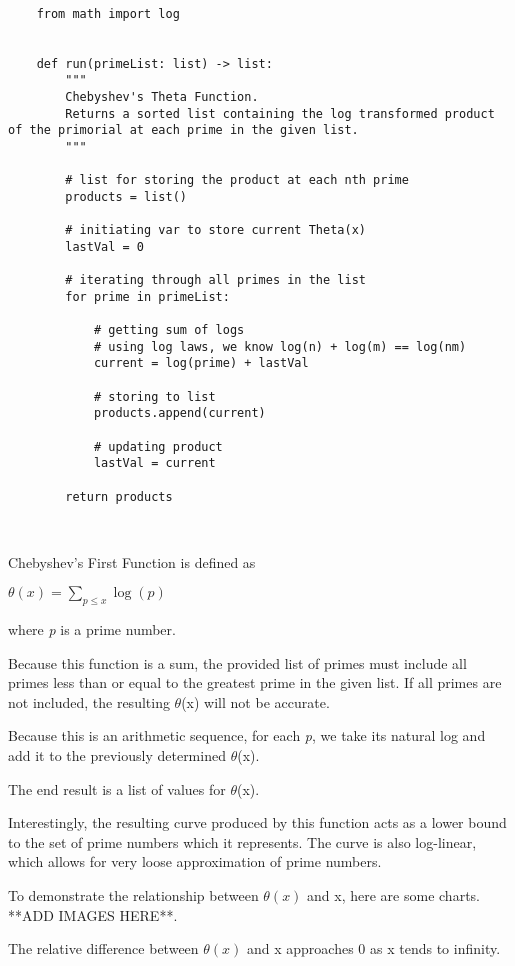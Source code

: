 \documentclass[11pt]{article}
\begin{document}
	
\lstset{style = Theta}

\begin{lstlisting}
	
	from math import log
	
	
	def run(primeList: list) -> list:
		"""
		Chebyshev's Theta Function.
		Returns a sorted list containing the log transformed product of the primorial at each prime in the given list.
		"""
		
		# list for storing the product at each nth prime
		products = list()
		
		# initiating var to store current Theta(x)
		lastVal = 0
		
		# iterating through all primes in the list
		for prime in primeList:
		
			# getting sum of logs
			# using log laws, we know log(n) + log(m) == log(nm)
			current = log(prime) + lastVal
			
			# storing to list
			products.append(current)
			
			# updating product
			lastVal = current
		
		return products
	
		
\end{lstlisting}


Chebyshev's First Function is defined as

$\theta(x) = \sum_{\textit{p} \leq x} \log(\textit{p})$

where \textit{p} is a prime number.

Because this function is a sum, the provided list of primes must include all primes less than or equal to the greatest prime in the given list. If all primes are not included, the resulting $\theta$(x) will not be accurate.

Because this is an arithmetic sequence, for each \textit{p}, we take its natural log and add it to the previously determined $\theta$(x).

The end result is a list of values for $\theta$(x).

Interestingly, the resulting curve produced by this function acts as a lower bound to the set of prime numbers which it represents. The curve is also log-linear, which allows for very loose approximation of prime numbers.

To demonstrate the relationship between $\theta(x)$ and x, here are some charts.
**ADD IMAGES HERE**.

The relative difference between $\theta(x)$ and x approaches 0 as x tends to infinity.
\end{document}
